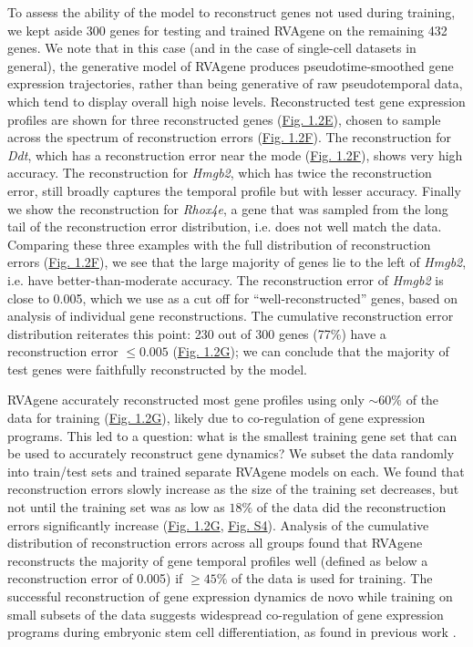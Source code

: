 {
To assess the ability of the model to reconstruct genes not used during training, we kept aside 300 genes for testing and trained RVAgene on the remaining 432 genes.
We note that in this case (and in the case of single-cell datasets in general), the generative model of RVAgene produces pseudotime-smoothed gene expression trajectories, rather than being generative of raw pseudotemporal data, which tend to display overall high noise levels.
}
Reconstructed test gene expression profiles are shown for three reconstructed genes
(\hyperref[fig:fig3]{Fig. 1.2E}), chosen to sample across the spectrum of reconstruction errors
(\hyperref[fig:fig3]{Fig. 1.2F}). The reconstruction for {\em Ddt}, which has a reconstruction error
near the mode (\hyperref[fig:fig3]{Fig. 1.2F}), shows very high accuracy. The reconstruction for
{\em Hmgb2}, which has twice the reconstruction error, still broadly captures the temporal profile
but with lesser accuracy. Finally we show the reconstruction for {\em Rhox4e}, a gene that was
sampled from the long tail of the reconstruction error distribution, i.e. does not well match the
data. Comparing these three examples with the full distribution of reconstruction errors
(\hyperref[fig:fig3]{Fig. 1.2F}), we see that the large majority of genes lie to the left of {\em
Hmgb2}, i.e. have better-than-moderate accuracy. The reconstruction error of {\em Hmgb2} is close to
0.005, which we use as a cut off for ``well-reconstructed'' genes, based on analysis of individual
gene reconstructions. The cumulative reconstruction error distribution reiterates this point: 230
out of 300 genes (77\%) have a reconstruction error $\leq 0.005$ (\hyperref[fig:fig3]{Fig. 1.2G}); we can conclude that the majority of test genes were faithfully reconstructed by the model.
\par
RVAgene accurately reconstructed most gene profiles using only $\sim60 {\%}$ of the data for
training (\hyperref[fig:fig3]{Fig. 1.2G}), likely due to co-regulation of gene expression programs.
This led to a question: what is the smallest training gene set that can be used to accurately
reconstruct gene dynamics? We subset the data randomly into train/test sets and trained separate
RVAgene models on each. We found that reconstruction errors slowly increase as the size of the
training set decreases, but not until the training set was as low as $18\%$ of the data did the
reconstruction errors significantly increase (\hyperref[fig:fig3]{Fig. 1.2G}, \hyperref[supp]{Fig. S4}). Analysis of the cumulative distribution of reconstruction errors across all groups found that RVAgene reconstructs the majority of gene temporal profiles well (defined as below a reconstruction error of 0.005) if $\geq 45\%$ of the data is used for training. The successful reconstruction of gene expression dynamics de novo while training on  small subsets of the data suggests widespread co-regulation of gene expression programs during embryonic stem cell differentiation, as found in previous work \citep{jang2017dynamics}.

